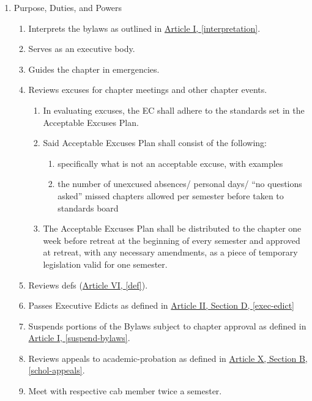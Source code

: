 \begin{enumerate}
		\item Purpose, Duties, and Powers
			\begin{enumerate}
				\item Interprets the bylaws as outlined in \hyperref[interpretation]{Article I, \autoref*{interpretation}}. 
				\item Serves as an executive body.
				\item Guides the chapter in emergencies.
				\item Reviews excuses for chapter meetings and other chapter events.
					\begin{enumerate}
					\item In evaluating excuses, the EC shall adhere to the standards set in the
					Acceptable Excuses Plan.
					\item Said Acceptable Excuses Plan shall consist of the following:
						\begin{enumerate} specifically what is an acceptable excuse, with examples
						\item specifically what is not an acceptable excuse, with examples
						\item the number of unexcused absences/ personal days/ “no questions
						asked” missed chapters allowed per semester before taken to
						standards board
						\end{enumerate}
					\item The Acceptable Excuses Plan shall be distributed to the chapter one
					week before retreat at the beginning of every semester and approved at
					retreat, with any necessary amendments, as a piece of temporary
					legislation valid for one semester.
					\end{enumerate}
				\item Reviews \glspl{def} (\hyperref[def]{Article VI, \autoref*{def}}). 
				\item Passes Executive Edicts as defined in \hyperref[exec-edict]{Article II, Section D, \autoref*{exec-edict}}
				\item Suspends portions of the Bylaws subject to chapter approval as defined in \hyperref[suspend-bylaws]{Article I, \autoref*{suspend-bylaws}}.
				\item Reviews appeals to \gls{academic-probation} as defined in \hyperref[schol-appeals]{Article X, Section B, \autoref*{schol-appeals}}.
				\item Meet with respective \gls{cab} member twice a semester.
			\end{enumerate}


\end{enumerate}
